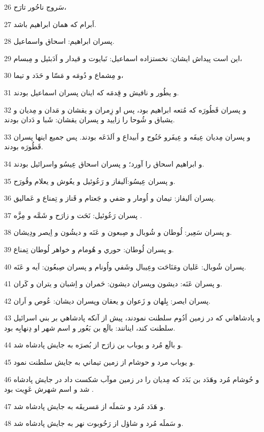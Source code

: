 \par 26 سَروج ناحُور تارَح،
\par 27 اَبرام که همان ابراهيم باشد.
\par 28 پسران ابراهيم: اسحاق واسماعيل.
\par 29 اين است پيداش ايشان: نخستزاده اسماعيل: نَبايوت و قيدار و اَدَبئيل و مِبسام،
\par 30 و مِشماع و دُومَه و مَسّا و حَدَد و تيما،
\par 31 و يطُور و نافيش و قِدمَه که اينان پسران اسماعيل بودند.
\par 32 و پسران قَطُورَه که مُتعه ابراهيم بود، پس او زِمران و يقشان و مَدان و مِديان و يشباق و شُوحا را زاييد و پسران يقشان: شَبا و دَدان بودند.
\par 33 و پسران مِديان عِيفَه و عِيفَرو خَنُوح و اَبيداع و اَلدَعَه بودند. پس جميع اينها پسران قَطُورَه بودند.
\par 34 و ابراهيم اسحاق را آورد؛ و پسران اسحاق عِيسُو واسرائيل بودند.
\par 35 و پسران عِيسُو:اَليفاز و رَعُوئيل و يعُوش و يعلام وقُورَح.
\par 36 پسران اَليفاز: تيمان و اُومار و صَفي و جَعتام و قَناز و تِمناع و عَماليق.
\par 37 پسران رَعُوئيل: نَحَت و زارَح و شَمَّه و مِزَّه .
\par 38 و پسران سَعِير: لُوطان و شُوبال و صِبعون و عَنَه و ديشُون و اِيصر ودِيشان.
\par 39 و پسران لُوطان: حوري و هُومام و خواهر لُوطان تِمناع.
\par 40 پسران شُوبال: عَليان ومَنَاحَت وعِيبال وشَفي واُونام و پسران صِبعُون: اَيه و عَنَه.
\par 41 و پسران عَنَه: ديشون وپسران ديشون: حَمران و اِشبان و يتران و کَران.
\par 42 پسران ايصر: بِلهان و زَعوان و يعقان وپسران ديشان: عُوص و اَران.
\par 43 و پادشاهاني که در زمين اَدُوم سلطنت نمودند، پيش از آنکه پادشاهي بر بني اسرائيل سلطنت کند، اينانند: بالَع بن بَعُور و اسم شهر او دِنهابِه بود.
\par 44 و بالَع مُرد و يوباب بن زارَح از بُصرَه به جايش پادشاه شد.
\par 45 و يوباب مرد و حوشام از زمين تيماني به جايش سلطنت نمود.
\par 46 و حُوشام مُرد وهَدَد بن بَدَد که مِديان را در زمين موآب شکست داد در جايش پادشاه شد و اسم شهرش عَوِيت بود .
\par 47 و هَدَد مُرد و سَملَه از مَسريقَه به جايش پادشاه شد.
\par 48 و سَملَه مُرد و شاؤل از رَحُوبوت نهر به جايش پادشاه شد.
